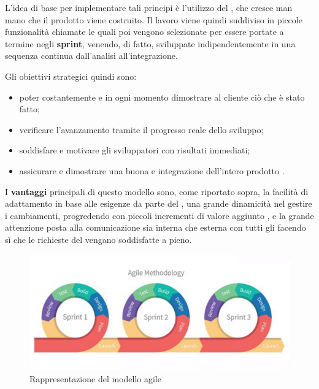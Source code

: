 L’idea di base per implementare tali principi è l’utilizzo del \textbf{}, che cresce man mano che il prodotto viene costruito. \newline
Il lavoro viene quindi suddiviso in piccole funzionalità chiamate \textbf{} le quali poi vengono selezionate per essere portate a termine negli \textbf{sprint}, venendo, di fatto, sviluppate indipendentemente in una sequenza continua dall’analisi all’integrazione. \newline

Gli obiettivi strategici quindi sono:
\begin{itemize}
    \item poter costantemente e in ogni momento dimostrare al cliente ciò che è stato fatto;
    \item verificare l’avanzamento tramite il progresso reale dello sviluppo;
    \item soddisfare e motivare gli sviluppatori con risultati immediati;
    \item assicurare e dimostrare una buona  e integrazione dell’intero prodotto .
\end{itemize}

I \textbf{vantaggi} principali di questo modello sono, come riportato sopra, la facilità di adattamento in base alle esigenze da parte del , 
una grande dinamicità nel gestire i cambiamenti, progredendo con piccoli incrementi di valore aggiunto ,
e la grande attenzione posta alla comunicazione sia interna che esterna con tutti gli  facendo sì che le richieste del \proponente{} vengano soddisfatte a pieno.

\begin{figure}[H]
    \centering
    \includegraphics[scale = 0.25]{components/img/agile.png}
    \caption{Rappresentazione del modello agile}
    \label{fig:Rappresentazione del modello agile}
\end{figure}



